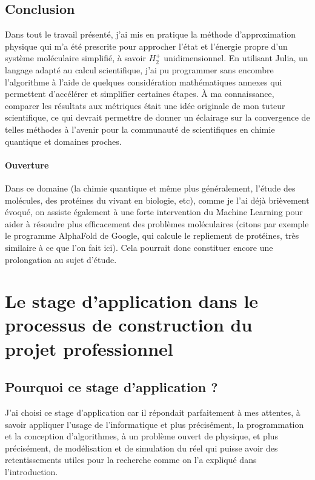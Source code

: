 \documentclass[svgnames,dvipsnames,a4paper,10pt,french]{report}
\begin{document}
\section{Conclusion}
Dans tout le travail présenté, j'ai mis en pratique la méthode d'approximation physique qui m'a été prescrite pour approcher l'état et l'énergie propre d'un système moléculaire simplifié, à savoir $H_2^+$ unidimensionnel. En utilisant Julia, un langage adapté au calcul scientifique, j'ai pu programmer sans encombre l'algorithme à l'aide de quelques considération mathématiques annexes qui permettent d'accélérer et simplifier certaines étapes. À ma connaissance, comparer les résultats aux métriques était une idée originale de mon tuteur scientifique, ce qui devrait permettre de donner un éclairage sur la convergence de telles méthodes à l'avenir pour la communauté de scientifiques en chimie quantique et domaines proches.

\subsubsection{Ouverture}
Dans ce domaine (la chimie quantique et même plus généralement, l'étude des molécules, des protéines du vivant en biologie, etc), comme je l'ai déjà brièvement évoqué, on assiste également à une forte intervention du Machine Learning pour aider à résoudre plus efficacement des problèmes moléculaires (citons par exemple le programme AlphaFold de Google, qui calcule le repliement de protéines, très similaire à ce que l'on fait ici). Cela pourrait donc constituer encore une prolongation au sujet d'étude.




\chapter{Le stage d’application dans le processus de construction du projet professionnel}
\section{Pourquoi ce stage d’application ?}
J'ai choisi ce stage d'application car il répondait parfaitement à mes attentes, à savoir appliquer l'usage de l'informatique et plus précisément, la programmation et la conception d'algorithmes, à un problème ouvert de physique, et plus précisément, de modélisation et de simulation du réel qui puisse avoir des retentissements utiles pour la recherche comme on l'a expliqué dans l'introduction. 
\end{document}
